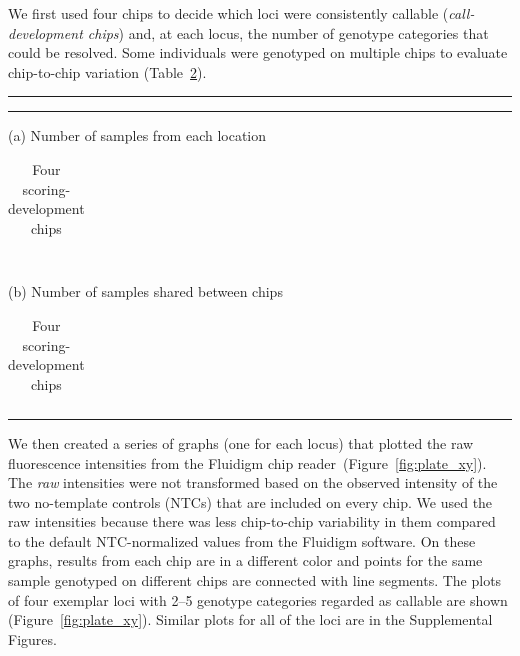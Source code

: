 We first used four chips to decide which loci were consistently callable 
({\em call-development chips}) and, at each locus, the number of genotype categories that
could be resolved. Some individuals were genotyped on multiple chips to evaluate chip-to-chip variation (Table~\ref{tab:devo-samps}). 
\begin{table}
\hrule \kern 0.5mm \hrule
\small
\caption{Four scoring-development chips}
\label{tab:devo-samps}
(a) Number of samples from each location
\begin{center}
\begin{tabular}{lrrr}

\hline
\end{tabular}
\end{center}
\mbox{}\\
(b) Number of samples shared between chips
\begin{center}
\begin{tabular}{lrrrr}

\hline
\end{tabular}
\end{center}
\hrule
\end{table}
We then created a
series of graphs (one for each locus) that plotted the raw fluorescence
intensities from the Fluidigm chip reader~(Figure~\ref{fig:plate_xy}). The {\em raw} intensities
were not transformed based on the
observed intensity of the two no-template controls (NTCs) that are included on every chip.
We used the raw intensities because there was less chip-to-chip
variability in them
compared to the default NTC-normalized values from the Fluidigm software. On these 
graphs, results from each
chip are in a different color and points for the same sample genotyped on
different chips are connected with line segments. The plots of four exemplar loci
with 2--5 genotype categories regarded as callable are
shown (Figure~\ref{fig:plate_xy}). 
Similar plots for all of the loci are in the Supplemental Figures.

